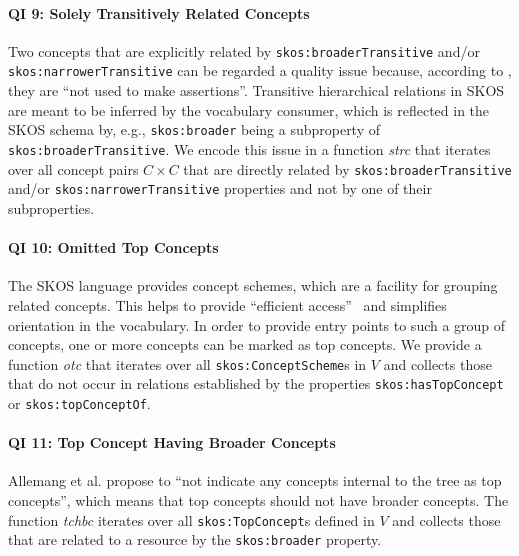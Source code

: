 \paragraph{QI 9: Solely Transitively Related Concepts}

Two concepts that are explicitly related by \texttt{skos:broaderTransitive} and/or \texttt{skos:narrowerTransitive} can be regarded a quality issue because, according to \cite{SkosReference2008}, they are ``not used to make assertions''. Transitive hierarchical relations in SKOS are meant to be inferred by the vocabulary consumer, which is reflected in the SKOS schema by, e.g., \texttt{skos:broader} being a subproperty of \texttt{skos:broaderTransitive}. 
We encode this issue in a function \textit{strc} that iterates over all concept pairs $C \times C$ that are directly related by \texttt{skos:broaderTransitive} and/or \texttt{skos:narrowerTransitive} properties and not by one of their subproperties.

\paragraph{QI 10: Omitted Top Concepts}

The SKOS language provides concept schemes, which are a facility for grouping related concepts. This helps to provide ``efficient access''~\cite{Isaac2009} and simplifies orientation in the vocabulary. In order to provide entry points to such a group of concepts, one or more concepts can be marked as top concepts.  
We provide a function \textit{otc} that iterates over all \texttt{skos:ConceptScheme}s in $V$ and collects those that do not occur in relations established by the properties \texttt{skos:hasTopConcept} or \texttt{skos:topConceptOf}.

\paragraph{QI 11: Top Concept Having Broader Concepts}

Allemang et al. \cite{Allemang2011} propose to ``not indicate any concepts internal to the tree as top concepts'', which means that top concepts should not have broader concepts. 
The function \textit{tchbc} iterates over all \texttt{skos:TopConcept}s defined in $V$ and collects those that are related to a resource by the \texttt{skos:broader} property.

